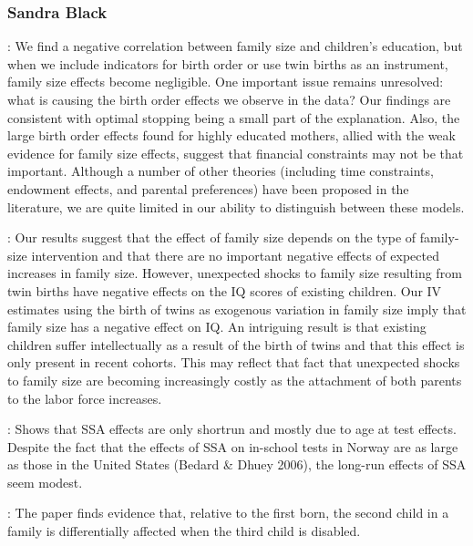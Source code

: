 \documentclass[11pt,a4paper,twoside]{article}
\begin{document}
\cite{cunha_technology_2007}

\cite{yi_early_2015}

\cite{giannola_parental_2024}

\subsubsection{Sandra Black}
\cite{black_more_2005}: We find a negative correlation between family size and children’s education, but when we include indicators for birth order or use twin births as an instrument, family size effects become negligible. One important issue remains unresolved: what is causing the birth order effects we observe in the data? Our findings are consistent with optimal stopping being a small part of the explanation. Also, the large birth order effects found for highly educated mothers, allied with the weak evidence for family size effects, suggest that financial constraints may not be that important. Although a number of other theories (including time constraints, endowment effects, and parental preferences) have been proposed in the literature, we are quite limited in our ability to distinguish between these models.


\cite{black_small_2010}: Our results suggest that the effect of family size depends on the type of family-size intervention and that there are no important negative effects of expected increases in family size. However, unexpected shocks to family size resulting from twin births have negative effects on the IQ scores of existing children. Our IV estimates using the birth of twins as exogenous variation in family size imply that family size has a negative effect on IQ. An intriguing result is that existing children suffer intellectually as a result of the birth of twins and that this effect is only present in recent cohorts. This may reflect that fact that unexpected shocks to family size are becoming increasingly costly as the attachment of both parents to the labor force increases.

\cite{black_too_2011}: Shows that SSA effects are only shortrun and mostly due to age at test effects. Despite the fact that the effects of SSA on in-school tests in Norway are as large as those in the United States (Bedard & Dhuey 2006), the long-run effects of SSA seem modest.

\cite{black_sibling_2021}: The paper finds evidence that, relative to the first born, the second child in a family is differentially affected when the third child is disabled.
\end{document}
